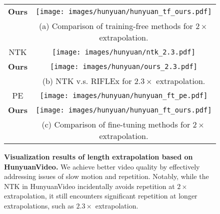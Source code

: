 \begin{figure*}[ht]
{\begin{tabular}{cc}
\begin{minipage}{0.05\textwidth}
        \small \textbf{Ours}
    \end{minipage}
    &
    \begin{minipage}{0.95\textwidth}
        \centering
        \texttt{[image: images/hunyuan/hunyuan\_tf\_ours.pdf]}
    \end{minipage} \\
    & 
    (a) Comparison of training-free methods for $2\times$ extrapolation. \\[0.5ex]
    \begin{minipage}{0.05\textwidth}
        \centering
        \small NTK
    \end{minipage}
    &
    \begin{minipage}{0.95\textwidth}
        \centering
        \texttt{[image: images/hunyuan/ntk\_2.3.pdf]}
    \end{minipage} \\
    \begin{minipage}{0.05\textwidth}
        \centering
        \small \textbf{Ours}
    \end{minipage}
    &
    \begin{minipage}{0.95\textwidth}
        \centering
        \texttt{[image: images/hunyuan/ours\_2.3.pdf]}
    \end{minipage} \\
    &
    (b) NTK v.s. RIFLEx for $2.3\times$ extrapolation. \\[0.5ex]
    \begin{minipage}{0.05\textwidth}
        \centering
        \small PE
    \end{minipage}
    &
    \begin{minipage}{0.95\textwidth}
        \centering
        \texttt{[image: images/hunyuan/hunyuan\_ft\_pe.pdf]}
    \end{minipage} \\
    \begin{minipage}{0.05\textwidth}
        \centering
        \small \textbf{Ours}
    \end{minipage}
    &
    \begin{minipage}{0.95\textwidth}
        \centering
        \texttt{[image: images/hunyuan/hunyuan\_ft\_ours.pdf]}
    \end{minipage} \\
    &
    (c) Comparison of fine-tuning methods for $2\times$ extrapolation. \\
    \end{tabular}
    }
\caption{\textbf{Visualization results of length extrapolation based on HunyuanVideo.} We achieve better video quality by effectively addressing issues of slow motion and repetition. Notably, while the NTK in HunyuanVideo incidentally avoids repetition at $2\times$ extrapolation, it still encounters significant repetition at longer extrapolations, such as $2.3\times$ extrapolation.}
\vspace{-.2cm}
\label{fig:Hunyuan}
\end{figure*}
